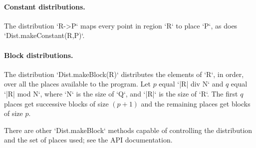 \paragraph{Constant distributions.} 
The distribution \xcd`R->P` maps every point in region \xcd`R` to place \xcd`P`, as does
\xcd`Dist.makeConstant(R,P)`. 

\paragraph{Block distributions.}
The distribution \xcd`Dist.makeBlock(R)` distributes the elements of \xcd`R`,
in order, over all the places available to the program. 
Let $p$ equal \xcd`|R| div N` and $q$ equal \xcd`|R| mod N`,
where \xcd`N` is the size of \xcd`Q`, and 
\xcd`|R|` is the size of \xcd`R`.  The first $q$ places get
successive blocks of size $(p+1)$ and the remaining places get blocks of
size $p$.

There are other \xcd`Dist.makeBlock` methods capable of controlling the
distribution and the set of places used; see the API documentation.


